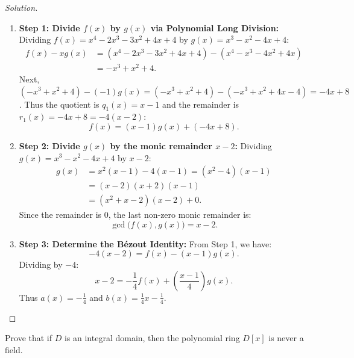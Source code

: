\begin{proof}[Solution]
\begin{enumerate}[label=\arabic*., leftmargin=*]
    \item \textbf{Step 1: Divide $f(x)$ by $g(x)$ via Polynomial Long Division:}
    Dividing $f(x) = x^4 - 2x^3 - 3x^2 + 4x + 4$ by $g(x) = x^3 - x^2 - 4x + 4$:
    \begin{align*}
    f(x) - x g(x) &= (x^4 - 2x^3 - 3x^2 + 4x + 4) - (x^4 - x^3 - 4x^2 + 4x) \\
    &= -x^3 + x^2 + 4.
    \end{align*}
    Next, $(-x^3 + x^2 + 4) - (-1)g(x) = (-x^3 + x^2 + 4) - (-x^3 + x^2 + 4x - 4) = -4x + 8$.
    Thus the quotient is $q_1(x) = x - 1$ and the remainder is $r_1(x) = -4x + 8 = -4(x - 2)$:
    \begin{equation*}
    f(x) = (x - 1)g(x) + (-4x + 8).
    \end{equation*}

    \item \textbf{Step 2: Divide $g(x)$ by the monic remainder $x - 2$:}
    Dividing $g(x) = x^3 - x^2 - 4x + 4$ by $x - 2$:
    \begin{align*}
    g(x) &= x^2(x - 1) - 4(x - 1) = (x^2 - 4)(x - 1) \\
    &= (x - 2)(x + 2)(x - 1) \\
    &= (x^2 + x - 2)(x - 2) + 0.
    \end{align*}
    Since the remainder is $0$, the last non-zero monic remainder is:
    \begin{equation*}
    \gcd\bigl(f(x), g(x)\bigr) = x - 2.
    \end{equation*}

    \item \textbf{Step 3: Determine the Bézout Identity:}
    From Step 1, we have:
    \begin{equation*}
    -4(x - 2) = f(x) - (x - 1)g(x).
    \end{equation*}
    Dividing by $-4$:
    \begin{equation*}
    x - 2 = -\frac{1}{4}f(x) + \left(\frac{x - 1}{4}\right)g(x).
    \end{equation*}
    Thus $a(x) = -\frac{1}{4}$ and $b(x) = \frac{1}{4}x - \frac{1}{4}$.
\end{enumerate}
\end{proof}

\begin{problem}
Prove that if $D$ is an integral domain, then the polynomial ring $D[x]$ is never a field.
\end{problem}

